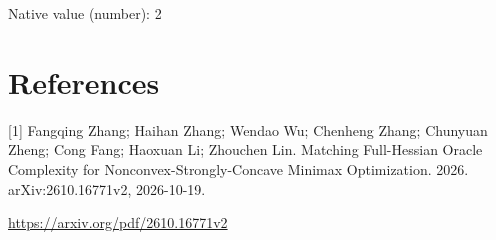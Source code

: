 \documentclass[10pt,a4paper]{article}
\begin{document}
Native value (number): 2

\section{References}
[1] Fangqing Zhang; Haihan Zhang; Wendao Wu; Chenheng Zhang; Chunyuan Zheng; Cong Fang; Haoxuan Li; Zhouchen Lin. Matching Full-Hessian Oracle Complexity for Nonconvex-Strongly-Concave Minimax Optimization. 2026. arXiv:2610.16771v2, 2026-10-19.

\url{https://arxiv.org/pdf/2610.16771v2}
\end{document}
